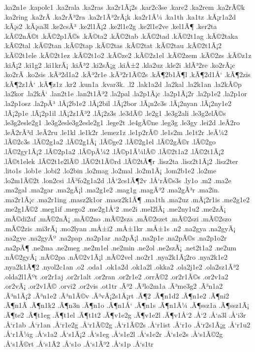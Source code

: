 {.ka2n1e
.kapolc1
.ka2rala
.ka2ras
.ka2r1Ã¡2s
.kar2c3se
.kare2
.ka2rem
.ka2rÃ©k
.ka2ring
.ka2rÃ­
.ka2rÃ³2ra
.ka2r1Ã³2rÃ¡k
.ka2r1Ã¼
.ka1th
.ka1tz
.kÃ¡r1a2d
.kÃ¡s2
.kÃ¡sa3l
.ke2csÃ³
.ke2l1Ã¡2
.ke2l1e2g
.ke2l1e2ve
.kel1Ã¶
.ker2ta
.kÃ©2nÃ©t
.kÃ©2p1Ã©s
.kÃ©ta2
.kÃ©2tab
.kÃ©2tad
.kÃ©2t1ag
.kÃ©2taka
.kÃ©2tal
.kÃ©2tan
.kÃ©2tap
.kÃ©2tas
.kÃ©2tat
.kÃ©2tau
.kÃ©2t1Ã¡2
.kÃ©2t1ele
.kÃ©2t1ez
.kÃ©2t1o2
.kÃ©ze2
.kÃ©2z1el
.kÃ©2zem
.kÃ©2zs
.kÃ©z1z
.kiÃ¡2
.ki1g2
.ki1krÃ¡
.kiÃ³2
.ki2sÃ¡g
.kiÅ±2
.kla2uz
.kle2i
.klÃ³2re
.ko2rÃ¡c
.ko2rÃ­
.ko2sis
.kÃ³2d1a2
.kÃ³2r1e
.kÃ³2r1Ã©2s
.kÃ¶2b1Ã¶l
.kÃ¶2d1Å‘
.kÃ¶2zis
.kÃ¶2z1Å‘
.kÃ¶z1z
.kr2
.kun1a
.kvar3k.
.l2
.lak1a2d
.la2kal
.la2k1an
.la2kÃ©p
.la2kor
.la2kÅ‘
.lan2t1e
.lan2t1Ã³2
.la2pal
.la2p1Ã¡c
.la2p1Ã¡2r
.la2p1e2
.la2p1or
.la2p1osz
.la2pÃ³
.lÃ¡2b1e2
.lÃ¡2bil
.lÃ¡2bor
.lÃ¡n2c3s
.lÃ¡2nyan
.lÃ¡2ny1e2
.lÃ¡2p1e
.lÃ¡2p1il
.lÃ¡2z1Ã³2
.lÃ¡2z3s
.le3dÃ©
.le2g1
.le3g2ali
.le3g2elÃ©s
.le3g2esle2g1
.le3g2esle3g2esle2g1
.lege2t
.le4gÃ©ne
.leg3g
.le3gy
.lei2d
.leÃ­2ro
.leÃ­2rÃ³d
.leÃ­2ru
.le1kl
.le1k2r
.lemez1z
.le1p2rÃ©
.le1s2m
.le1t2r
.leÃ¼2
.lÃ©2c3s
.lÃ©2g1a2
.lÃ©2g1Ã¡
.lÃ©ge2
.lÃ©2g1el
.lÃ©2gÃ©r
.lÃ©2go
.lÃ©2gy1Ã¡2
.lÃ©2p1a2
.lÃ©pÃ¼2
.lÃ©p1Ã¼lÃ©
.lÃ©2t1a2
.lÃ©2t1Ã¡2
.lÃ©t1elek
.lÃ©2t1e2lÃ©
.lÃ©2t1Ã©rd
.lÃ©2tÃ¶r
.lisz2ta
.lisz2t1Ã¡2
.lisz2ter
.lito1s
.lob1e
.lobi2
.lo2bin
.lo2mag
.lo2mal
.lo2m1Ã¡
.lom2b1e2
.lo2me
.lo2m1Ã©2t
.lon2csi
.lÃ³fo2g1a2d
.lÅ‘2cs1Ã¶2v
.lÅ‘rÃ©s3s
.ly1o
.m2
.ma2e
.ma2gal
.ma2gar
.ma2gÃ¡l
.ma2g1e2
.mag1g
.magÃ³2
.ma2gÃ³r
.ma2in.
.ma2r1Ã¡c
.ma2r1ing
.masz2k1or
.masz2k1Ã¶
.ma1th
.ma2uz
.mÃ¡2r1is
.me2g1e2
.me2g1Ã©2
.meg1if
.mego2
.me2g1Å‘2
.me2i
.mel2lÃ¡
.me2ny1u2
.me2zÃ¡
.mÃ©di2af
.mÃ©2nÃ¡
.mÃ©2no
.mÃ©2sza
.mÃ©2szet
.mÃ©2szi
.mÃ©2szo
.mÃ©2zis
.mi3rÃ¡
.mo2lyan
.mÅ±i2
.mÅ±1kr
.mÅ±1s
.n2
.na2gya
.na2gyÃ¡
.na2gye
.na2gyÃº
.na2pap
.na2p1ar
.na2pÃ¡l
.na2p1e
.na2pÃ©s
.na2p1o2r
.na2pÃ¶
.ne2ma
.ne2meg
.ne2m1el
.ne2min
.ne2ol
.ne2szÃ¡
.net2t1a2
.ne2um
.nÃ©2gyÃ¡
.nÃ©2pa
.nÃ©2v1Ã¡l
.nÃ©2vel
.no2r1
.nya2k1Ã¡2ro
.nya2k1e2
.nya2k1Ã¶2
.nyol2c1an
.o2
.oda1
.ok1a2d
.ok1a2l
.okka2
.ola2j1e2
.ola2sz1Ã³2
.olda2l1Ãºt
.or2r1aj
.or2r1alt
.or2ran
.or2r1e2
.orrÃ©2
.or2r1Ã©s
.or2v1a2
.or2vÃ¡
.or2v1Ã©
.orvi2
.or2vis
.ot1tr
.Ã³2
.Ã³lo2m1a
.Ã³me3g2
.Ã³n1a2
.Ã³n1Ã¡2
.Ã³n1e2
.Ã³n1Ã©v
.Ã³vÃ¡2s1Ã¡rt
.Ã¶2
.Ã¶n1d2
.Ã¶n1e2
.Ã¶ni2
.Ã¶n1Ã­
.Ã¶n1k2
.Ã¶n3n
.Ã¶n1o
.Ã¶n1Å‘
.Ã¶n1s
.Ã¶n1Ã¼
.Ã¶ssz1a
.Ã¶ssz1Ã¡
.Ã¶te2
.Ã¶t1eg
.Ã¶t1el
.Ã¶t1t2
.Ã¶v1e2g
.Ã¶v1e2l
.Ã¶v1Å‘2
.Å‘2
.Å‘a3l
.Å‘i3r
.Å‘r1ab
.Å‘r1an
.Å‘r1e2g
.Å‘r1Ã©2g
.Å‘r1Ã©2s
.Å‘r1ist
.Å‘r1o
.Å‘r2s1Ã¡g
.Å‘r1u2
.Å‘r1Ã¼g
.Å‘s1a2
.Å‘s1Ã¡2
.Å‘s1eg
.Å‘s1e2l
.Å‘s1e2r
.Å‘s1e2s
.Å‘s1Ã©2g
.Å‘s1Ã©rt
.Å‘s1Ã­2
.Å‘s1o
.Å‘s1Ã³2
.Å‘s1p
.Å‘s1tr
}
